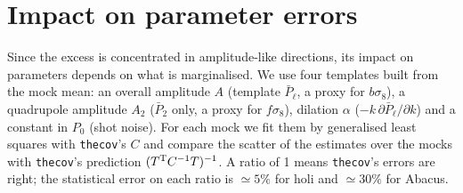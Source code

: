 \documentclass[11pt]{article}
\newcommand{\thecov}{\texttt{thecov}}
\begin{document}
\section{Impact on parameter errors}
\label{sec:params}

Since the excess is concentrated in amplitude-like directions, its impact on parameters depends on what is marginalised. We use four templates built from the mock mean: an overall amplitude $A$ (template $\bar P_\ell$, a proxy for $b\sigma_8$), a quadrupole amplitude $A_2$ ($\bar P_2$ only, a proxy for $f\sigma_8$), dilation $\alpha$ ($-k\,\partial\bar P_\ell/\partial k$) and a constant in $P_0$ (shot noise). For each mock we fit them by generalised least squares with \thecov's $C$ and compare the scatter of the estimates over the mocks with \thecov's prediction $(T^{\rm T}C^{-1}T)^{-1}$. A ratio of 1 means \thecov's errors are right; the statistical error on each ratio is $\simeq5\%$ for holi and $\simeq30\%$ for Abacus.
\end{document}
